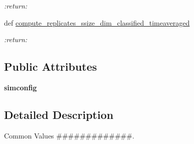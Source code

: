 \begin{DoxyCompactItemize}
\begin{DoxyCompactList}\small\item\em \-:return\-: \end{DoxyCompactList}\item 
\hypertarget{classctpy_1_1math_1_1simulation__calculations_1_1_simulation_calculations_a0159756aa16d7b4c2229ca4d143b05df}{def \hyperlink{classctpy_1_1math_1_1simulation__calculations_1_1_simulation_calculations_a0159756aa16d7b4c2229ca4d143b05df}{compute\-\_\-replicates\-\_\-ssize\-\_\-dim\-\_\-classified\-\_\-timeaveraged}}\label{classctpy_1_1math_1_1simulation__calculations_1_1_simulation_calculations_a0159756aa16d7b4c2229ca4d143b05df}

\begin{DoxyCompactList}\small\item\em \-:return\-: \end{DoxyCompactList}\end{DoxyCompactItemize}
\subsection*{Public Attributes}
\begin{DoxyCompactItemize}
\item 
\hypertarget{classctpy_1_1math_1_1simulation__calculations_1_1_simulation_calculations_af7970b2eae3b3acd6133b9f96373d3de}{{\bfseries simconfig}}\label{classctpy_1_1math_1_1simulation__calculations_1_1_simulation_calculations_af7970b2eae3b3acd6133b9f96373d3de}

\end{DoxyCompactItemize}


\subsection{Detailed Description}
Common Values \#\#\#\#\#\#\#\#\#\#\#\#\#. 

